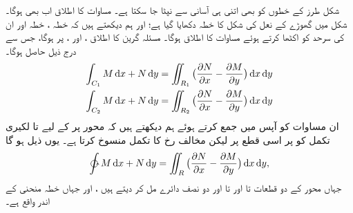  شکل    طرز کے خطوں کو بھی اتنی ہی  آسانی  سے نپٹا جا سکتا ہے۔ مساوات     کا اطلاق اب بھی ہوگا۔ شکل      میں گھوڑے کے نعل کی شکل کا خطہ  دکھایا گیا ہے؛  اور ہم دیکھتے  ہیں کہ خطہ  ، خطہ   اور ان کی سرحد  کو اکٹھا کرتے ہوئے مساوات      کا اطلاق  ہوگا۔  مسئلہ  گرین کا اطلاق   ،  اور ،   پر  ہوگا، جس سے درج ذیل حاصل ہوگا۔ 
\begin{align*}
\int_{C_1}M \dif x+N \dif y&=\iint_{R_1}\big(\frac{\partial N}{\partial x}-\frac{\partial M}{\partial y}\big) \dif x \dif y \\     
\int_{C_2} M \dif x + N \dif y &= \iint_{R_2} \big(\frac{\partial N}{\partial x} - \frac{\partial M}{\partial y}\big) \dif x \dif y 
\end{align*}
 ان  مساوات کو آپس میں جمع کرتے ہوئے ہم دیکھتے ہیں کہ محور     پر  کے لیے   تا     لکیری تکمل کو  پر اسی قطع  پر   لیکن مخالف رخ کا تکمل  منسوخ کرتا ہے۔  یوں   ذیل ہو گا
\begin{align*}
\ointctrclockwise M \dif x + N \dif y = \iint_R \big(\frac{\partial N}{\partial x} 
- \frac{\partial M}{\partial y}\big) \dif x \dif y, 
\end{align*}
 جہاں   محور  کے دو قطعات    تا  اور  تا  اور دو نصف دائرے مل کر  دیتے ہیں ،  اور  جہاں خطہ   منحنی   کے اندر واقع ہے۔
 
